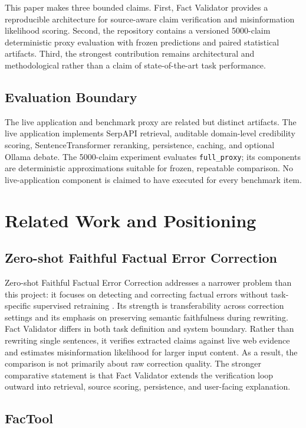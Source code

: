 \documentclass[conference]{IEEEtran}
\begin{document}
This paper makes three bounded claims. First, Fact Validator provides a reproducible architecture for source-aware claim verification and misinformation likelihood scoring. Second, the repository contains a versioned 5000-claim deterministic proxy evaluation with frozen predictions and paired statistical artifacts. Third, the strongest contribution remains architectural and methodological rather than a claim of state-of-the-art task performance.

\subsection{Evaluation Boundary}
The live application and benchmark proxy are related but distinct artifacts. The live application implements SerpAPI retrieval, auditable domain-level credibility scoring, SentenceTransformer reranking, persistence, caching, and optional Ollama debate. The 5000-claim experiment evaluates \texttt{full\_proxy}; its components are deterministic approximations suitable for frozen, repeatable comparison. No live-application component is claimed to have executed for every benchmark item.

\section{Related Work and Positioning}

\subsection{Zero-shot Faithful Factual Error Correction}

Zero-shot Faithful Factual Error Correction addresses a narrower problem than this project: it focuses on detecting and correcting factual errors without task-specific supervised retraining \cite{kubota2023zero}. Its strength is transferability across correction settings and its emphasis on preserving semantic faithfulness during rewriting. Fact Validator differs in both task definition and system boundary. Rather than rewriting single sentences, it verifies extracted claims against live web evidence and estimates misinformation likelihood for larger input content. As a result, the comparison is not primarily about raw correction quality. The stronger comparative statement is that Fact Validator extends the verification loop outward into retrieval, source scoring, persistence, and user-facing explanation.

\subsection{FacTool}
\end{document}
